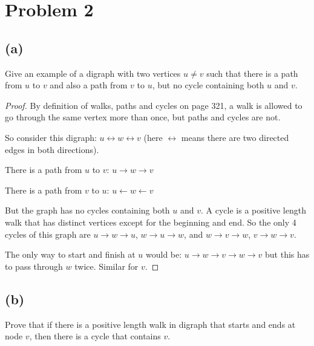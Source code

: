 \documentclass[14pt]{extarticle}
\begin{document}
\section{Problem 2}
\subsection{(a)}
Give an example of a digraph with two vertices $u \neq v$ such that there is a path from $u$ to $v$ and also a path from $v$ to $u$, but no cycle containing both $u$ and $v$.

\begin{proof}
By definition of walks, paths and cycles on page 321, a walk is allowed to go through the same vertex more than once, but paths and cycles are not.

So consider this digraph: $u \leftrightarrow w \leftrightarrow v$ (here $\leftrightarrow$ means there are two directed edges in both directions).

There is a path from $u$ to $v$: $u \rightarrow w \rightarrow v$

There is a path from $v$ to $u$: $u \leftarrow w \leftarrow v$

But the graph has no cycles containing both $u$ and $v$. A cycle is a positive length walk that has distinct vertices except for the beginning and end. So the only 4 cycles of this graph are $u \rightarrow w \rightarrow u$, $w \rightarrow u \rightarrow w$, and $w \rightarrow v \rightarrow w$, $v \rightarrow w \rightarrow v$.

The only way to start and finish at $u$ would be: $u \rightarrow w \rightarrow v \rightarrow w \rightarrow v$ but this has to pass through $w$ twice. Similar for $v$.
\end{proof}

\subsection{(b)}
Prove that if there is a positive length walk in digraph that starts and ends at node $v$, then there is a cycle that contains $v$.
\end{document}
